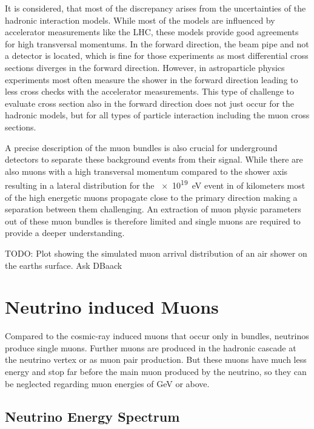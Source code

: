 It is considered, that most of the discrepancy arises from the uncertainties of the hadronic interaction models.
While most of the models are influenced by accelerator measurements like the LHC, these models provide good agreements for high transversal momentums.
In the forward direction, the beam pipe and not a detector is located, which is fine for those experiments as most differential cross sections diverges in the forward direction.
However, in astroparticle physics experiments most often measure the shower in the forward direction leading to less cross checks with the accelerator measurements.
This type of challenge to evaluate cross section also in the forward direction does not just occur for the hadronic models, but for all types of particle interaction including the muon cross sections.

A precise description of the muon bundles is also crucial for underground detectors to separate these background events from their signal.
While there are also muons with a high transversal momentum compared to the shower axis resulting in a lateral distribution for the \SI{e19}{eV} event in  of kilometers \cite{Engel11EAS} most of the high energetic muons propagate close to the primary direction making a separation between them challenging.
An extraction of muon physic parameters out of these muon bundles is therefore limited and single muons are required to provide a deeper understanding.

TODO: Plot showing the simulated muon arrival distribution of an air shower on the earths surface. Ask DBaack

%
% 
%
%

\section{Neutrino induced Muons}

Compared to the cosmic-ray induced muons that occur only in bundles, neutrinos produce single muons.
Further muons are produced in the hadronic cascade at the neutrino vertex or as muon pair production.
But these muons have much less energy and stop far before the main muon produced by the neutrino, so they can be neglected regarding muon energies of GeV or above.

\subsection{Neutrino Energy Spectrum}

